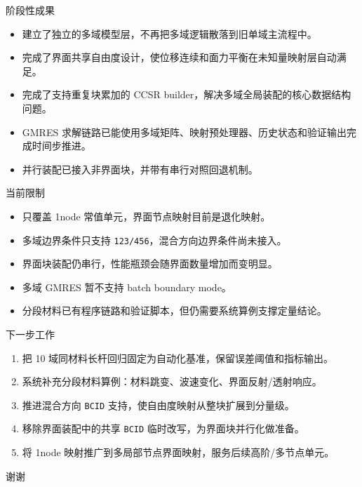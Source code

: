 \documentclass[aspectratio=169,UTF8]{ctexbeamer}
\newcommand{\code}[1]{\texttt{\small #1}}
\begin{document}
\begin{frame}{阶段性成果}
  \begin{itemize}
    \item 建立了独立的多域模型层，不再把多域逻辑散落到旧单域主流程中。
    \item 完成了界面共享自由度设计，使位移连续和面力平衡在未知量映射层自动满足。
    \item 完成了支持重复块累加的 CCSR builder，解决多域全局装配的核心数据结构问题。
    \item GMRES 求解链路已能使用多域矩阵、映射预处理器、历史状态和验证输出完成时间步推进。
    \item 并行装配已接入非界面块，并带有串行对照回退机制。
  \end{itemize}
\end{frame}

\begin{frame}{当前限制}
  \begin{itemize}
    \item 只覆盖 1node 常值单元，界面节点映射目前是退化映射。
    \item 多域边界条件只支持 \code{123/456}，混合方向边界条件尚未接入。
    \item 界面块装配仍串行，性能瓶颈会随界面数量增加而变明显。
    \item 多域 GMRES 暂不支持 batch boundary mode。
    \item 分段材料已有程序链路和验证脚本，但仍需要系统算例支撑定量结论。
  \end{itemize}
\end{frame}

\begin{frame}{下一步工作}
  \begin{enumerate}
    \item 把 10 域同材料长杆回归固定为自动化基准，保留误差阈值和指标输出。
    \item 系统补充分段材料算例：材料跳变、波速变化、界面反射/透射响应。
    \item 推进混合方向 \code{BCID} 支持，使自由度映射从整块扩展到分量级。
    \item 移除界面装配中的共享 \code{BCID} 临时改写，为界面块并行化做准备。
    \item 将 1node 映射推广到多局部节点界面映射，服务后续高阶/多节点单元。
  \end{enumerate}
\end{frame}

\begin{frame}
  \centering
  \Huge 谢谢
\end{frame}
\end{document}
